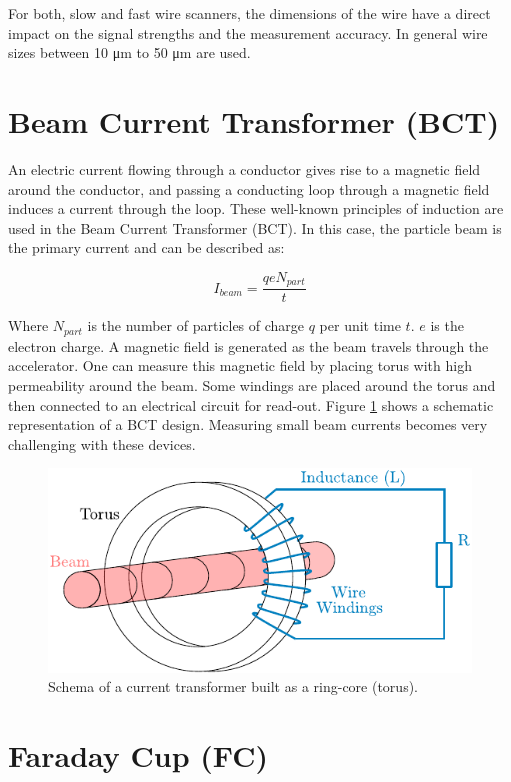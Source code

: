 For both, slow and fast wire scanners, the dimensions of the wire have a direct impact on the signal strengths and the measurement accuracy. In general wire sizes between 10 \si[]{\micro \metre} to 50 \si[]{\micro \metre}  are used.

\section{Beam Current Transformer (BCT)}
\label{sec:BCT}

An electric current flowing through a conductor gives rise to a magnetic field around the conductor, and passing a conducting loop through a magnetic field induces a current through the loop. These well-known principles of induction are used in the Beam Current Transformer (BCT). In this case, the particle beam is the primary current and can be described as: 

\begin{equation}
    I_{beam} = \frac{q e N_{part}}{t}
\end{equation}

Where $N_{part}$ is the number of particles of charge $q$ per unit time $t$. $e$ is the electron charge. A magnetic field is generated as the beam travels through the accelerator. One can measure this magnetic field by placing torus with high permeability around the beam. Some windings are placed around the torus and then connected to an electrical circuit for read-out. Figure \ref{fig:BCTschema} shows a schematic representation of a BCT design. Measuring small beam currents becomes very challenging with these devices.

\begin{figure}[h]
    \centering
    \includegraphics[width=0.6\columnwidth]{BCTschema/BCTschema.pdf}
    \caption{Schema of a current transformer built as a ring-core (torus). }
    \label{fig:BCTschema}
\end{figure}

\section{Faraday Cup (FC)}
\label{sec:FC}

